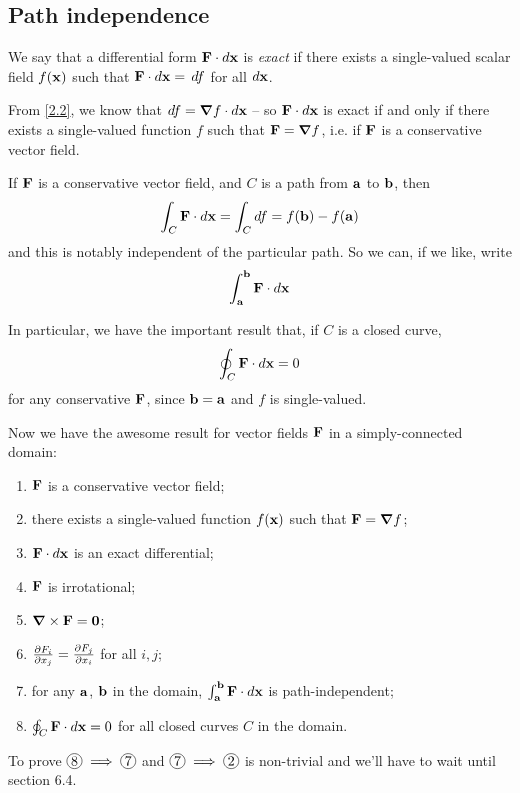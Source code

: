 \documentclass{../../template/note}
\begin{document}
    \subsection{Path independence}

    \begin{definition*}
        We say that a differential form \(\V F \cdot d \V x\) is \emph{exact} if there exists a single-valued scalar field \(f(\V x)\) such that \(\V F \cdot d \V x = \D f\) for all \(d \V x\).
    \end{definition*}
    
    From \cref{2.2}, we know that \(df = \grad f \cdot d \V x\) -- so \(\V F \cdot d \V x\) is exact if and only if there exists a single-valued function \(f\) such that \(\V F = \grad f\), i.e. if \(\V F\) is a conservative vector field.

    If \(\V F\) is a conservative vector field, and \(C\) is a path from \(\V a\) to \(\V b\), then
    \begin{align*}
        \int_C \V F \cdot d \V x = \int_C df = f(\V b) - f(\V a)
    \end{align*}
    and this is notably independent of the particular path. So we can, if we like, write
    \begin{align*}
        \int_{\V a}^{\V b} \V F \cdot d \V x
    \end{align*}
    
    In particular, we have the important result that, if \(C\) is a closed curve,
    \begin{align*}
        \oint_C \V F \cdot d \V x = 0
    \end{align*}
    for any conservative \(\V F\), since \(\V b = \V a\) and \(f\) is single-valued.

    Now we have the awesome result for vector fields \(\V F\) in a simply-connected domain:

    \begin{enumerate}[label=\protect\circled{\arabic*}]
        \item \(\V F\) is a conservative vector field;
        \item there exists a single-valued function \(f(\V x)\) such that \(\V F = \grad f\);
        \item \(\V F \cdot d \V x\) is an exact differential;
        \item \(\V F\) is irrotational;
        \item \(\grad \times \V F = \V 0\);
        \item \(\pd{F_i}{x_j} = \pd{F_j}{x_i}\) for all \(i, j\);
        \item for any \(\V a\), \(\V b\) in the domain, \(\int_{\V a}^{\V b} \V F \cdot d \V x\) is path-independent;
        \item \(\oint_C \V F \cdot d \V x = 0\) for all closed curves \(C\) in the domain.
    \end{enumerate}
    To prove \(\circled 8 \implies \circled 7\) and \(\circled 7 \implies \circled 2\) is non-trivial and we'll have to wait until section 6.4.
\end{document}
